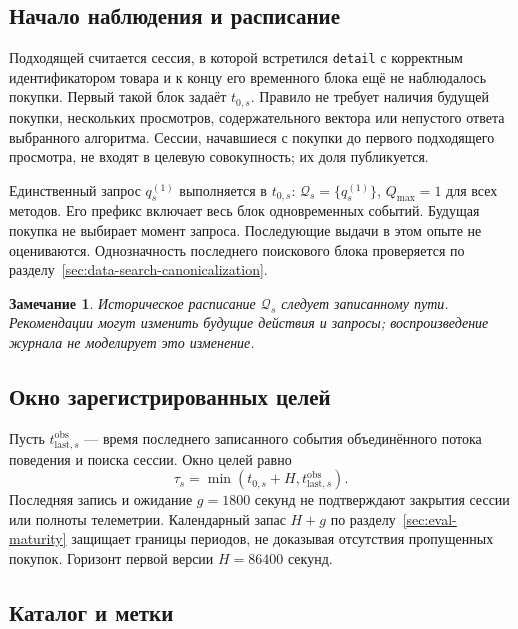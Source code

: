 \documentclass[12pt,a4paper]{article}
\newcommand{\code}[1]{{\ttfamily\small\nolinkurl{#1}}}
\theoremstyle{plainru}
\newtheorem{remark}{Замечание}[section]
\begin{document}
\subsection{Начало наблюдения и расписание}

Подходящей считается сессия, в которой встретился \code{detail}
с корректным идентификатором товара и к концу его временного блока
ещё не наблюдалось покупки. Первый такой блок задаёт \(t_{0,s}\).
Правило не требует наличия будущей покупки, нескольких просмотров,
содержательного вектора или непустого ответа выбранного алгоритма.
Сессии, начавшиеся с покупки до первого подходящего просмотра,
не входят в целевую совокупность; их доля публикуется.

Единственный запрос $q_s^{(1)}$ выполняется в \(t_{0,s}\):
$\mathcal Q_s=\{q_s^{(1)}\}$, $Q_{\max}=1$ для всех методов.
Его префикс включает весь блок одновременных событий.
Будущая покупка не выбирает момент запроса. Последующие выдачи
в этом опыте не оцениваются. Однозначность последнего поискового
блока проверяется по разделу~\ref{sec:data-search-canonicalization}.

\begin{remark}
Историческое расписание \(\mathcal Q_s\) следует записанному пути.
Рекомендации могут изменить будущие действия и запросы; воспроизведение
журнала не моделирует это изменение.
\end{remark}

\subsection{Окно зарегистрированных целей}

Пусть $t_{\mathrm{last},s}^{\mathrm{obs}}$ --- время последнего записанного
события объединённого потока поведения и поиска сессии. Окно целей равно
\begin{equation}\label{eq:request-horizon}
\tau_s=\min(t_{0,s}+H,t_{\mathrm{last},s}^{\mathrm{obs}}).
\end{equation}
Последняя запись и ожидание $g=1800$ секунд не подтверждают закрытия
сессии или полноты телеметрии. Календарный запас $H+g$ по
разделу~\ref{sec:eval-maturity} защищает границы периодов, не доказывая
отсутствия пропущенных покупок. Горизонт первой версии $H=86400$ секунд.

\subsection{Каталог и метки}
\end{document}
